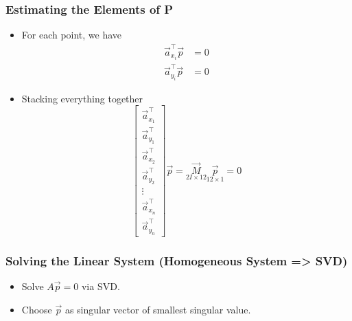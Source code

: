\begin{frame}
\begin{center}
  \end{center}

\end{frame}


\begin{frame}
  \frametitle{Estimating the Elements of P}

  \begin{itemize}
    \item For each point, we have
    \begin{align*}
        \vec{a}_{x_i}^{\top} \vec{p} &= 0 \\
        \vec{a}_{y_i}^{\top} \vec{p} &= 0
    \end{align*}
    \item Stacking everything together
    \begin{equation*}
      \begin{bmatrix}
        \vec{a}_{x_1}^{\top} \\
        \vec{a}_{y_1}^{\top} \\
        \vec{a}_{x_2}^{\top} \\
        \vec{a}_{y_2}^{\top} \\
        \vdots \\
        \vec{a}_{x_n}^{\top} \\
        \vec{a}_{y_n}^{\top}
      \end{bmatrix} \vec{p} = \underset{2I\times 12}{\vec{M}} \underset{12\times1}{\vec{p}} = 0
    \end{equation*}
  \end{itemize}

\end{frame}


\begin{frame}
  \frametitle{Solving the Linear System (Homogeneous System => SVD)}
  \begin{itemize}
    \item Solve $A\vec{p}=0$ via SVD.
    \item Choose $\vec{p}$ as singular vector of smallest singular value.
  \end{itemize}
\end{frame}

